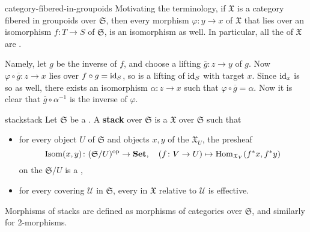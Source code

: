 \begin{example}{category-fibered-in-groupoids}
    Motivating the terminology, if $\mathfrak{X}$ is a category fibered in groupoids over $\mathfrak{S}$, then every morphism $\varphi \colon y \to x$ of $\mathfrak{X}$ that lies over an isomorphism $f \colon T \to S$ of $\mathfrak{S}$, is an isomorphism as well. In particular, all the  of $\mathfrak{X}$ are .

    Namely, let $g$ be the inverse of $f$, and choose a lifting $\overline{g} \colon z \to y$ of $g$. Now $\varphi \circ \overline{g} \colon z \to x$ lies over $f \circ g = \textup{id}_S$, so is a lifting of $\textup{id}_S$ with target $x$. Since $\textup{id}_x$ is so as well, there exists an isomorphism $\alpha \colon z \to x$ such that $\varphi \circ \overline{g} = \alpha$. Now it is clear that $\overline{g} \circ \alpha^{-1}$ is the inverse of $\varphi$.
\end{example}

\begin{topic}{stack}{stack}
    Let $\mathfrak{S}$ be a . A \textbf{stack} over $\mathfrak{S}$ is a  $\mathfrak{X}$ over $\mathfrak{S}$ such that
    \begin{itemize}
        \item for every object $U$ of $\mathfrak{S}$ and objects $x, y$ of the  $\mathfrak{X}_U$, the presheaf
        \[ \textup{Isom}(x, y) \colon (\mathfrak{S}/U)^\textup{op} \to \textbf{Set}, \quad (f \colon V \to U) \mapsto \operatorname{Hom}_{\mathfrak{X}_V}(f^* x, f^* y) \]
        on the  $\mathfrak{S}/U$ is a ,
        \item for every covering $\mathcal{U}$ in $\mathfrak{S}$, every  in $\mathfrak{X}$ relative to $\mathcal{U}$ is effective.
    \end{itemize}
    Morphisms of stacks are defined as morphisms of categories over $\mathfrak{S}$, and similarly for 2-morphisms.
\end{topic}

